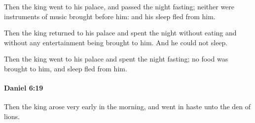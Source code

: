			\begin{versebox}
					\item[BHS] 
					\item[LXX] 
					\item[ASV] Then the king went to his palace, and passed the night fasting; neither were instruments of music brought before him: and his sleep fled from him.
					\item[NIV] Then the king returned to his palace and spent the night without eating and without any entertainment being brought to him. And he could not sleep.
					\item[NRSV] Then the king went to his palace and spent the night fasting; no food was brought to him, and sleep fled from him.
			\end{versebox}

		\paragraph{Daniel 6:19} %
			\label{DANIEL-6-19}

			Then the king arose very early in the morning, and went in haste unto the den of lions.

